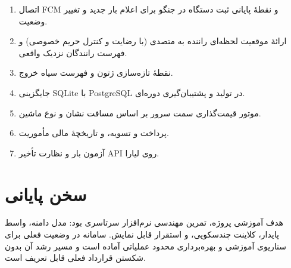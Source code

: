 \begin{enumerate}
  \item اتصال \textenglish{FCM} و نقطهٔ پایانی ثبت دستگاه در جنگو برای اعلام بار جدید و تغییر وضعیت.
  \item ارائهٔ موقعیت لحظه‌ای راننده به متصدی (با رضایت و کنترل حریم خصوصی) و فهرست رانندگان نزدیک واقعی.
  \item نقطهٔ تازه‌سازی ژتون و فهرست سیاه خروج.
  \item جایگزینی \textenglish{SQLite} با \textenglish{PostgreSQL} در تولید و پشتیبان‌گیری دوره‌ای.
  \item موتور قیمت‌گذاری سمت سرور بر اساس مسافت نشان و نوع ماشین.
  \item پرداخت و تسویه، و تاریخچهٔ مالی مأموریت.
  \item آزمون بار و نظارت تأخیر \textenglish{API} روی لیارا.
\end{enumerate}

\section{سخن پایانی}

هدف آموزشی پروژه، تمرین مهندسی نرم‌افزار سرتاسری بود: مدل دامنه، واسط پایدار، کلاینت چندسکویی، و استقرار قابل نمایش. سامانه در وضعیت فعلی برای سناریوی آموزشی و بهره‌برداری محدود عملیاتی آماده است و مسیر رشد آن بدون شکستن قرارداد فعلی قابل تعریف است.

